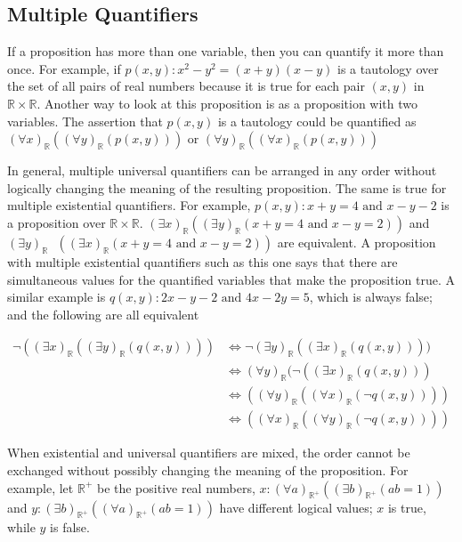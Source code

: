 \documentclass[10pt,]{book}
\theoremstyle{plain}
\theoremstyle{definition}
\theoremstyle{definition}
\theoremstyle{definition}
\theoremstyle{definition}
\begin{document}
\subsection[Multiple Quantifiers]{Multiple Quantifiers}\label{ss-multiple-quantifiers}
If a proposition has more than one variable, then you can quantify it more than once. For example, if \(p(x, y):x^2 - y^2 = (x + y)(x - y)\) is a tautology over the set of all pairs of real numbers because it is true for each pair \((x, y)\) in \(\mathbb{R} \times  \mathbb{R}\). Another way to look at this proposition is as a proposition with two variables. The assertion that \(p(x,y)\) is a tautology could be quantified as \((\forall x)_{\mathbb{R}} ((\forall y) _{\mathbb{R}}(p(x, y)))\) or \((\forall y)_{\mathbb{R}} ((\forall x) _{\mathbb{R}}(p(x, y)))\)%
\par
In general, multiple universal quantifiers can be arranged in any order without logically changing the meaning of the resulting proposition. The same is true for multiple existential quantifiers. For example, \(p(x, y) : x + y = 4 \textrm{ and } x - y - 2\) is a proposition over \(\mathbb{R} \times \mathbb{R}\). \((\exists x)_{\mathbb{R}} ((\exists y) _{\mathbb{R}} (x + y = 4 \textrm{ and } x - y = 2))\) and \((\exists y)_{\mathbb{R}}\textrm{ } ((\exists x) _{\mathbb{R}} (x + y = 4 \textrm{ and } x - y = 2))\) are equivalent. A proposition with multiple existential quantifiers such as this one says that there are simultaneous values for the quantified variables that make the proposition true. A similar example is \(q(x, y) : 2x - y - 2 \textrm{ and }4x - 2y = 5\), which is always false; and the following are all equivalent
%
\par
\begin{equation*}
\begin{split}
\neg ((\exists  x)_{\mathbb{R}}((\exists  y) _{\mathbb{R}}(q(x, y)))) 
	& \Leftrightarrow  \neg (\exists  y)_{\mathbb{R}}((\exists x)_{\mathbb{R}}(q(x, y)))) \\
	& \Leftrightarrow (\forall y)_{\mathbb{R}} (\neg ((\exists  x)_{\mathbb{R}}(q(x,y))) \\
   & \Leftrightarrow ((\forall y)_{\mathbb{R}} ((\forall x)_{\mathbb{R}} (\neg q(x, y))))\\
	& \Leftrightarrow ((\forall x)_{\mathbb{R}} ((\forall y)_{\mathbb{R}} (\neg q(x, y))))
\end{split}
\end{equation*}
%
\par
When existential and universal quantifiers are mixed, the order cannot be exchanged without possibly changing the meaning of the proposition. For example, let \(\mathbb{R}^+\) be the positive real numbers, \(x : (\forall a)_{\mathbb{R}^+} ((\exists  b)_{\mathbb{R}^+} (a b = 1))\) and \(y : (\exists  b)_{\mathbb{R}^+} ((\forall a)_{\mathbb{R}^+}(a b = 1))\) have different logical values; \(x\) is true, while \(y\) is false.%
\end{document}
